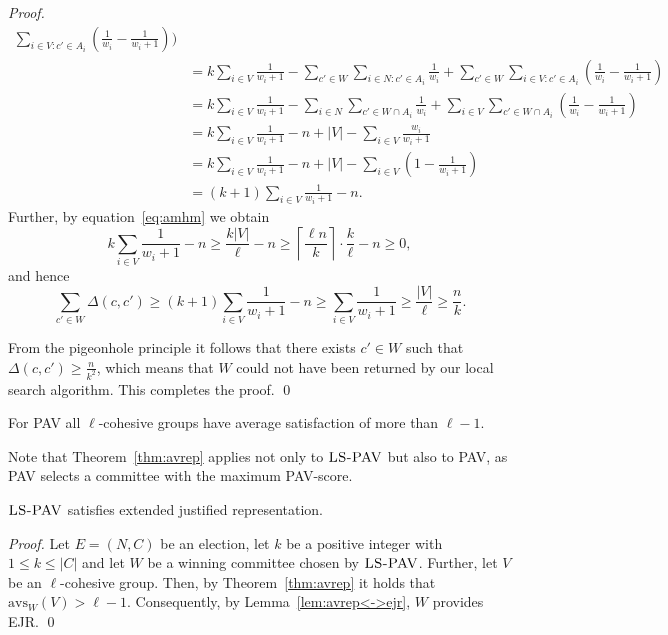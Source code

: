 \documentclass[envcountsame]{llncs}
\newcommand{\ejrls}{{{\textsc{LS-PAV}}}}
\newcommand{\aver}[1]{{{\mathrm{avs}_{#1}}}}
\begin{document}
\begin{proof}
{\begin{align*}
   \sum_{i \in V\colon c' \in A_i}\left(\frac{1}{w_i} - \frac{1}{w_i+1}\right) \Bigg) \\
&= k \sum_{i \in V} \frac{1}{w_i + 1} - \sum_{c' \in W} \sum_{i\in N\colon c' \in A_i} \frac{1}{w_i} + 
     \sum_{c' \in W} \sum_{i \in V\colon c' \in A_i}\left(\frac{1}{w_i} - \frac{1}{w_i+1}\right)  \\
&= k \sum_{i \in V} \frac{1}{w_i + 1} - \sum_{i \in N} \sum_{c' \in W \cap A_i} \frac{1}{w_i} + 
     \sum_{i \in V} \sum_{c' \in W \cap A_i} \left(\frac{1}{w_i} - \frac{1}{w_i+1}\right) \\
&= k \sum_{i \in V} \frac{1}{w_i + 1} - n + |V| - \sum_{i \in V} \frac{w_i}{w_i+1} \\
&= k \sum_{i \in V} \frac{1}{w_i + 1} - n + |V| - \sum_{i \in V} \left(1-\frac{1}{w_i+1}\right) \\
&= (k+1) \sum_{i \in V} \frac{1}{w_i + 1} - n.
\end{align*}
}
Further, by equation~\eqref{eq:amhm} we obtain
$$
k\sum_{i \in V} \frac{1}{w_i + 1} - n \ge \frac{k|V|}{\ell} - n 
\ge \left\lceil\frac{\ell n}{k}\right\rceil\cdot \frac{k}{\ell} - n \ge 0,
$$
and hence 
$$
\sum_{c' \in W} \Delta(c, c') \ge
(k+1)\sum_{i \in V} \frac{1}{w_i + 1} - n \ge \sum_{i \in V} \frac{1}{w_i + 1} \ge \frac{|V|}{\ell} \ge \frac{n}{k}.
$$

From the pigeonhole principle it follows that there exists $c' \in W$ such that $\Delta(c, c') \geq \frac{n}{k^2}$, 
which means that $W$ could not have been returned by our local search algorithm. This completes the proof.
\qed\end{proof}

\begin{corollary}
For PAV all $\ell$-cohesive groups have average satisfaction of more than $\ell-1$.
\end{corollary}

Note that Theorem~\ref{thm:avrep} applies not only to $\ejrls$ but also to PAV, as PAV selects a committee with 
the maximum PAV-score.

\begin{corollary}
$\ejrls$ satisfies extended justified representation.
\end{corollary}

\begin{proof}
Let $E=(N, C)$ be an election, let $k$ be a positive integer with $1\le k\le |C|$
and let $W$ be a winning committee chosen by $\ejrls$. 
Further, let $V$ be an $\ell$-cohesive group.
Then, by Theorem~\ref{thm:avrep} it holds that $\aver{W}(V)>\ell-1$.
Consequently, by Lemma~\ref{lem:avrep<->ejr}, $W$ provides EJR.
\qed\end{proof}
\end{document}
